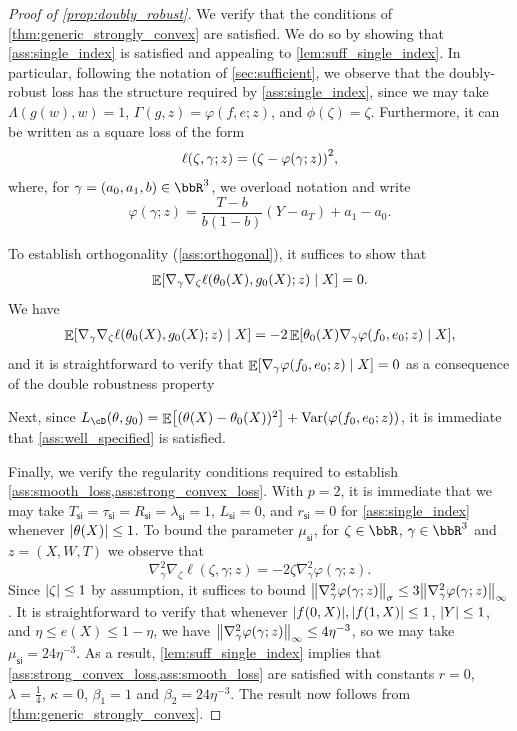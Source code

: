 \documentclass[11pt]{article} %
\newcommand{\pref}[1]{\cref{#1}}
\newcommand{\pfref}[1]{Proof of \pref{#1}}
\theoremstyle{theorem}  %
\theoremstyle{plain}
\DeclarePairedDelimiter{\abs}{\lvert}{\rvert} %
\DeclarePairedDelimiter{\brk}{[}{]}
\DeclarePairedDelimiter{\prn}{(}{)}
\DeclarePairedDelimiter{\nrm}{\|}{\|}
\DeclareMathOperator{\En}{\mathbb{E}}
\newcommand{\ls}{\ell}
\newcommand{\grad}{\nabla}
\newcommand{\vphi}{\varphi}
\newcommand{\poprisk}{L_{\cD}}
\newcommand{\si}{\mathsf{si}}
\newcommand{\Lsi}{L_{\si}}
\newcommand{\Rsi}{R_{\si}}
\newcommand{\Tsi}{T_{\si}}
\newcommand{\tausi}{\tau_{\si}}
\newcommand{\musi}{\mu_{\si}}
\newcommand{\gammasi}{\lambda_{\si}}
\newcommand{\rsi}{r_{\si}}
\begin{document}
\begin{proof}[\pfref{prop:doubly_robust}]
    We verify that the conditions of
  \pref{thm:generic_strongly_convex} are
  satisfied. We do so by showing that \pref{ass:single_index} is satisfied and appealing to \pref{lem:suff_single_index}. In particular, following the notation of \pref{sec:sufficient}, we observe that the doubly-robust loss has the structure required by \pref{ass:single_index}, since we may take $\Lambda(g(w),w)=1$, $\Gamma(g,z) = \vphi(f,e;z)$, and $\phi(\zeta)=\zeta$. Furthermore,
  it can be written as a square loss of the form
  \begin{align*}
    \ls(\zeta,\gamma;z) = \prn*{\zeta - \vphi(\gamma;z)}^2,
  \end{align*}
  where, for $\gamma = (a_0,a_1,b)\in\bbR^{3}$, we overload notation and write
  \[
    \vphi(\gamma;z) = \frac{T-b}{b(1-b)}(Y-a_T) +a_1-a_0.
  \]

  To establish orthogonality (\pref{ass:orthogonal}), it suffices to show that
  \begin{align*}
    \En\brk*{\grad_{\gamma}\grad_{\zeta}\ls(\theta_0(X),g_0(X);z)\mid{}X}=0.
  \end{align*}
  We have
  \begin{align*}
    \En\brk*{\grad_{\gamma}\grad_{\zeta}\ls(\theta_0(X),g_0(X);z)\mid{}X}
    = -2 \En\brk*{\theta_0(X)\grad_{\gamma}\vphi(f_0,e_0;z)\mid{}X}, 
  \end{align*}
  and it is straightforward to verify that $\En\brk*{\grad_{\gamma}\vphi(f_0,e_0;z)\mid{}X}=0$ as a consequence of the double robustness property
%
%
%
%
%
%
%
%
%
%
%
%
%
%
%
%
%
%
%
%
%
%
%
%
%
%
%
%
%
%
%
%
%
%

%

  Next, since $\poprisk(\theta,g_0)=\En\brk*{(\theta(X)-\theta_0(X))^2} + \mathrm{Var}(\vphi(f_0,e_0;z))$, it is immediate that \pref{ass:well_specified} is satisfied.
  
  Finally, we verify the regularity conditions required to establish \pref{ass:smooth_loss,ass:strong_convex_loss}. With $p=2$, it is immediate that we may take $\Tsi=\tausi=\Rsi=\gammasi=1$, $\Lsi=0$, and $\rsi=0$ for \pref{ass:single_index} whenever $\abs{\theta(X)}\leq{}1$. To bound the parameter $\musi$, for $\zeta\in\bbR$, $\gamma\in\bbR^3$ and $z=(X,W,T)$ we observe that
  \[
    \grad^{2}_{\gamma}\grad_{\zeta}\ls(\zeta,\gamma;z) = -2\zeta\grad^{2}_{\gamma}\vphi(\gamma;z).
  \]
  Since $\abs{\zeta}\leq{}1$ by assumption, it suffices to bound $\nrm*{\grad^{2}_{\gamma}\vphi(\gamma;z)}_{\sigma}\leq{}3 \nrm*{\grad^{2}_{\gamma}\vphi(\gamma;z)}_{\infty}$. It is straightforward to verify that whenever $\abs{f(0,X)},\abs{f(1,X)}\leq{}1$, $\abs{Y}\leq{}1$, and $\eta\leq{}e(X)\leq{}1-\eta$, we have $\nrm*{\grad^{2}_{\gamma}\vphi(\gamma;z)}_{\infty}\leq{}4\eta^{-3}$, so we may take $\musi=24\eta^{-3}$. As a result, \pref{lem:suff_single_index} implies that \pref{ass:strong_convex_loss,ass:smooth_loss} are satisfied with constants $r=0$, $\lambda = \frac{1}{4}$,  $\kappa=0$, $\beta_1=1$ and $\beta_2= 24\eta^{-3}$. The result now follows from \pref{thm:generic_strongly_convex}.
\end{proof}
\end{document}

